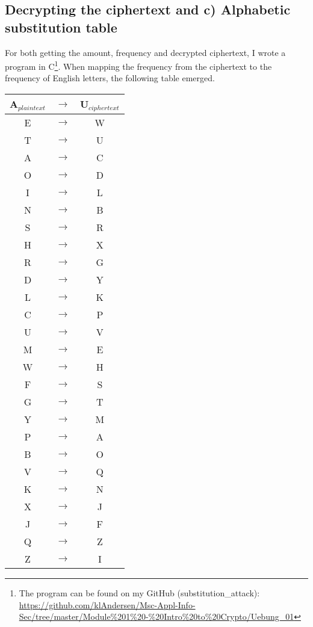 \subsection{Decrypting the ciphertext and c) Alphabetic substitution table}
\label{section:1bc}
For both getting the amount, frequency and decrypted ciphertext, I wrote a program in C\footnote{
	The program can be found on my GitHub (substitution\_attack): \\ 
	\url{https://github.com/klAndersen/Msc-Appl-Info-Sec/tree/master/Module\%201\%20-\%20Intro\%20to\%20Crypto/Uebung_01}
}. When mapping the frequency from the ciphertext to the frequency of English letters, the following table emerged. 
\begin{center}
	\begin{tabular}{ | c | c | c | } \hline 
		A$_{plaintext}$ & $\rightarrow$ & U$_{ciphertext}$ \\ \hline		 
		E & $\rightarrow$ & W \\ \hline 
		T & $\rightarrow$ & U \\ \hline 
		A & $\rightarrow$ & C \\ \hline 
		O & $\rightarrow$ & D \\ \hline 
		I & $\rightarrow$ & L \\ \hline 
		N & $\rightarrow$ & B \\ \hline 
		S & $\rightarrow$ & R \\ \hline 
		H & $\rightarrow$ & X \\ \hline 
		R & $\rightarrow$ & G \\ \hline 
		D & $\rightarrow$ & Y \\ \hline 
		L & $\rightarrow$ & K \\ \hline 
		C & $\rightarrow$ & P \\ \hline 
		U & $\rightarrow$ & V \\ \hline 
		M & $\rightarrow$ & E \\ \hline 
		W & $\rightarrow$ & H \\ \hline 
		F & $\rightarrow$ & S \\ \hline 
		G & $\rightarrow$ & T \\ \hline 
		Y & $\rightarrow$ & M \\ \hline 
		P & $\rightarrow$ & A \\ \hline 
		B & $\rightarrow$ & O \\ \hline 
		V & $\rightarrow$ & Q \\ \hline 
		K & $\rightarrow$ & N \\ \hline 
		X & $\rightarrow$ & J \\ \hline 
		J & $\rightarrow$ & F \\ \hline 
		Q & $\rightarrow$ & Z \\ \hline 
		Z & $\rightarrow$ & I \\ \hline 
	\end{tabular}
\end{center}
